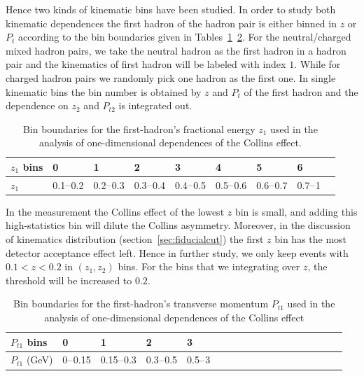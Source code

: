 Hence two kinds of kinematic bins have been studied. In order to study both kinematic dependences the first hadron of the hadron pair is either binned in $z$ or $P_t$ according to the bin boundaries given in Tables~\ref{tab:whatissinglez}~\ref{tab:whatissinglept}. For the neutral/charged mixed hadron pairs, we take the neutral hadron as the first hadron in a hadron pair and the kinematics of first hadron will be labeled with index $1$. While for charged hadron pairs we randomly pick one hadron as the first one. In single kinematic bins the bin number is obtained by $z$ and $P_{t}$ of the first hadron and the dependence on $z_2$ and $P_{t2}$ is integrated out. 
\begin{table}[H]\small
\centering
\begin{tabular}{|l|l|l|l|l|l|l|l|l|}
\hline
$z_1$ bins & 0 &  1 & 2 & 3 & 4 & 5 & 6  \\ \hline
 $z_1$  & {\color{red}0.1$\textup{--}$0.2} & 0.2$\textup{--}$0.3 & 0.3$\textup{--}$0.4 & 0.4$\textup{--}$0.5 & 0.5$\textup{--}$0.6 & 0.6$\textup{--}$0.7 & 0.7$\textup{--}$1  \\ \hline
\end{tabular}
\caption{Bin boundaries for the first-hadron's fractional energy $z_1$ used in the analysis of one-dimensional dependences of the Collins effect.}
\label{tab:whatissinglez}
\end{table}
In the measurement the Collins effect of the lowest $z$ bin is small, and adding this high-statistics bin will dilute the Collins asymmetry. Moreover, in the discussion of kinematics distribution (section~\ref{sec:fiducialcut}) the first $z$ bin has the most detector acceptance effect left. Hence in further study, we only keep events with $0.1<z<0.2$ in $(z_1,z_2)$ bins. For the bins that we integrating over $z$, the threshold will be increased to $0.2$.

\begin{table}[H]\small
\centering
\begin{tabular}{|l|l|l|l|l|l|l|l|l|l|l|l|l|l|l|l|l|l|}
\hline
 $P_{t1}$ bins & 0 &  1 & 2 & 3   \\ \hline
 $P_{t1}$ (GeV)  & 0$\textup{--}$0.15& 0.15$\textup{--}$0.3 & 0.3$\textup{--}$0.5 & 0.5$\textup{--}$3  \\ \hline
\end{tabular}
\caption{Bin boundaries for the first-hadron's transverse momentum $P_{t1}$ used in the analysis of one-dimensional dependences of the Collins effect}
\label{tab:whatissinglept}
\end{table}

